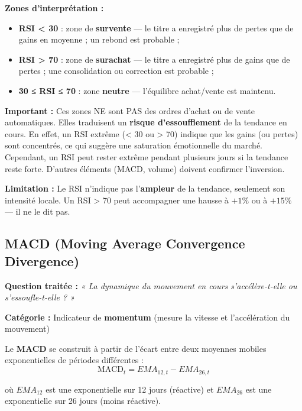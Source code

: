 \documentclass{rapportENSIAS} %
\begin{document}
\vspace{0.2cm}
\noindent
\textbf{Zones d'interprétation :}
\begin{itemize}
    \item \textbf{RSI < 30} : zone de \textbf{survente} — le titre a enregistré plus de pertes que de gains en moyenne ; un rebond est probable ;
    \item \textbf{RSI > 70} : zone de \textbf{surachat} — le titre a enregistré plus de gains que de pertes ; une consolidation ou correction est probable ;
    \item \textbf{30 ≤ RSI ≤ 70} : zone \textbf{neutre} — l'équilibre achat/vente est maintenu.
\end{itemize}

\noindent
\textbf{Important :} Ces zones NE sont PAS des ordres d'achat ou de vente automatiques. Elles traduisent un \textbf{risque d'essoufflement} de la tendance en cours. En effet, un RSI extrême (< 30 ou > 70) indique que les gains (ou pertes) sont concentrés, ce qui suggère une saturation émotionnelle du marché. Cependant, un RSI peut rester extrême pendant plusieurs jours si la tendance reste forte. D'autres éléments (MACD, volume) doivent confirmer l'inversion.

\vspace{0.2cm}
\noindent
\textbf{Limitation :} Le RSI n'indique pas l'\textbf{ampleur} de la tendance, seulement son intensité locale. Un RSI > 70 peut accompagner une hausse à $+1\%$ ou à $+15\%$ — il ne le dit pas.

\subsection{MACD (Moving Average Convergence Divergence)}

\noindent
\textbf{Question traitée :} \textit{« La dynamique du mouvement en cours s'accélère-t-elle ou s'essoufle-t-elle ? »}

\vspace{0.2cm}
\noindent
\textbf{Catégorie :} Indicateur de \textbf{momentum} (mesure la vitesse et l'accélération du mouvement)

\vspace{0.2cm}
\noindent
Le \textbf{MACD} se construit à partir de l'écart entre deux moyennes mobiles exponentielles de périodes différentes :
\[
\text{MACD}_t = EMA_{12,t} - EMA_{26,t}
\]

\noindent
où $EMA_{12}$ est une exponentielle sur 12 jours (réactive) et $EMA_{26}$ est une exponentielle sur 26 jours (moins réactive).
\end{document}
